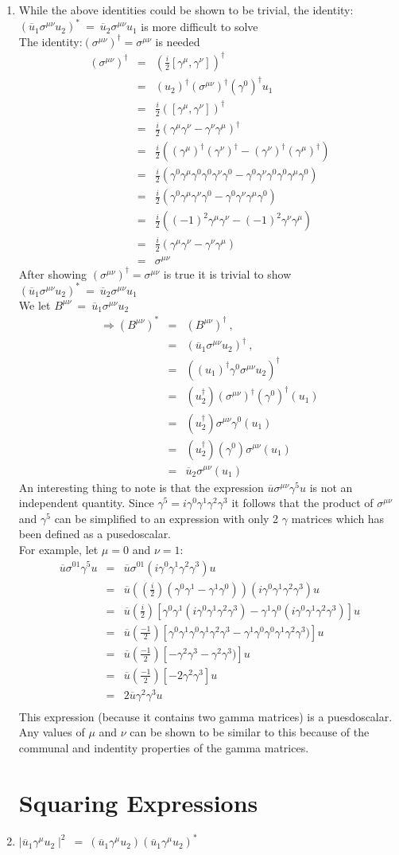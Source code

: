 \documentclass[12pt]{article}
\def \bea{\begin{eqnarray}}
\def \eea{\end{eqnarray}}
\def \nn{\nonumber}
\def \nl{\nn \\}
\def \ou{\overline{u}}
\def \ga{\gamma}
\def \si{\sigma}
\begin{document}
\begin{enumerate}
\item While the above identities could be shown to be trivial, the identity: $(\ou_1 \si^{\mu\nu} u_2)^* ~=~\ou_2 \si^{\mu\nu} u_1$ is more difficult to solve \nl
The identity:$(\si^{\mu\nu})^\dag =\si^{\mu\nu}$ is needed
\bea \nonumber
(\si^{\mu\nu})^\dag &=& (\frac{i}{2}[\ga^\mu,\ga^\nu])^\dag \nl
&=&(u_2)^\dag (\si^{\mu\nu})^\dag (\ga^0)^\dag u_1 \nl
&=& \frac{i}{2}([\ga^\mu,\ga^\nu])^\dag\nl
&=& \frac{i}{2}(\ga^\mu\ga^\nu-\ga^\nu\ga^\mu)^\dag \nl
&=& \frac{i}{2}((\ga^\mu)^\dag(\ga^\nu)^\dag-(\ga^\nu)^\dag(\ga^\mu)^\dag) \nl
&=& \frac{i}{2}(\ga^0\ga^\mu\ga^0\ga^0\ga^\nu\ga^0-\ga^0\ga^\nu\ga^0\ga^0\ga^\mu\ga^0)\nl
&=& \frac{i}{2}(\ga^0\ga^\mu\ga^\nu\ga^0-\ga^0\ga^\nu \ga^\mu\ga^0)\nl
&=& \frac{i}{2}((-1)^2\ga^\mu\ga^\nu-(-1)^2\ga^\nu \ga^\mu) \nl
&=& \frac{i}{2}(\ga^\mu\ga^\nu-\ga^\nu \ga^\mu)\nl
&=& \si^{\mu\nu}
\eea \nonumber
After showing $(\si^{\mu\nu})^\dag =\si^{\mu\nu}$ is true it is trivial to show $(\ou_1 \si^{\mu\nu} u_2)^* ~=~\ou_2 \si^{\mu\nu} u_1$ \nl
We let $B^{\mu\nu} ~=~ \ou_1 \si^{\mu\nu} u_2$ 
\bea
\Rightarrow (B^{\mu\nu})^* &=& (B^{\mu\nu})^\dag ~,~~ \nl
&=& (\ou_1 \si^{\mu\nu} u_2)^\dag ~,~~ \nl
&=& ((u_1)^\dag \ga^0 \si^{\mu\nu} u_2)^\dag \nl
&=& (u_2^\dag)(\si^{\mu\nu})^\dag (\ga^0)^\dag(u_1)\nl
&=& (u_2^\dag)\si^{\mu\nu}\ga^0(u_1)\nl
&=& (u_2^\dag)(\ga^0)\si^{\mu\nu}(u_1)\nl
&=& \ou_2 \si^{\mu\nu}(u_1) \nonumber
\eea \nonumber
An interesting thing to note is that the expression $\ou \si^{\mu\nu} \ga^5 u$ is not an independent quantity. Since $\ga^5 =i\ga^0\ga^1\ga^2\ga^3$ it follows that the product of $\si^{\mu\nu}$ and $\ga^5$ can be simplified to an expression with only 2 $\ga$ matrices which has been defined as a pusedoscalar.\nl 
For example, let $\mu =0$ and $\nu=1$:
\bea \nonumber
\ou \si^{01} \ga^5 u &=& \ou \si^{01} (i\ga^0\ga^1\ga^2\ga^3) u \nl
&=&  \ou ((\frac{i}{2})(\ga^0\ga^1 -\ga^1\ga^0)) (i\ga^0\ga^1\ga^2\ga^3) u \nl
&=&  \ou (\frac{i}{2})[\ga^0\ga^1(i\ga^0\ga^1\ga^2\ga^3) -\ga^1\ga^0(i\ga^0\ga^1\ga^2\ga^3)] u \nl
&=&  \ou (\frac{-1}{2})[\ga^0\ga^1\ga^0\ga^1\ga^2\ga^3 -\ga^1\ga^0\ga^0\ga^1\ga^2\ga^3)] u \nl
&=& \ou (\frac{-1}{2})[-\ga^2\ga^3 -\ga^2\ga^3)] u\nl
&=& \ou (\frac{-1}{2})[-2\ga^2\ga^3] u\nl
&=& 2\ou \ga^2\ga^3 u\nl \nonumber
\eea \nonumber
This expression (because it contains two gamma matrices) is a puesdoscalar. Any values of $\mu$ and $\nu$ can be shown to be similar to this because of the communal and indentity properties of the gamma matrices. 

\section{Squaring Expressions}
\item $\mid \ou_1 \ga^\mu u_2 \mid^2 ~=~ (\ou_1 \ga^\mu u_2)(\ou_1 \ga^\mu u_2 )^*$


\end{enumerate}
\end{document}
